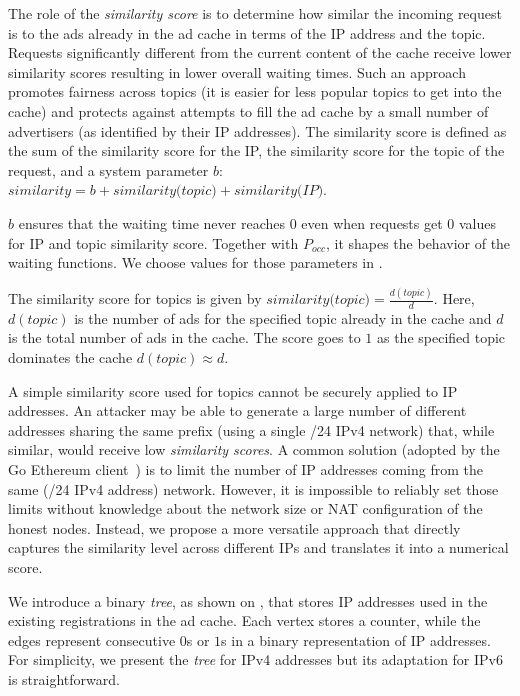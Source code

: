 The role of the \emph{similarity score} is to determine how similar the incoming request is to the ads already in the ad cache in terms of the IP address and the topic. 
Requests significantly different from the current content of the cache receive lower similarity scores resulting in lower overall waiting times. 
Such an approach promotes fairness across topics (it is easier for less popular topics to get into the cache) and protects against attempts to fill the ad cache by a small number of advertisers (as identified by their IP addresses). The similarity score is defined as the sum of the similarity score for the IP, the similarity score for the topic of the request, and a system parameter $b$: $\textit{similarity} = b + \textit{similarity(topic)} + \textit{similarity(IP)}$. 

$b$ ensures that the waiting time never reaches $0$ even when requests get $0$ values for IP and topic similarity score. Together with $P_\textit{occ}$, it shapes the behavior of the waiting functions. We choose values for those parameters in .

The similarity score for topics is given by $\textit{similarity(topic)}= \frac{d(topic)}{d}$.
Here, $d(topic)$ is the number of ads for the specified topic already in the cache and $d$ is the total number of ads in the cache. 
The score goes to $1$ as the specified topic dominates the cache $d(topic) \approx d$. 

A simple similarity score used for topics cannot be securely applied to IP addresses. 
An attacker may be able to generate a large number of different addresses sharing the same prefix (\eg using a single /24 IPv4 network) that, while similar, would receive low \emph{similarity scores}.
A common solution (\eg adopted by the Go Ethereum client~\cite{geth}) is to limit the number of IP addresses coming from the same (\eg /24 IPv4 address) network.
However, it is impossible to reliably set those limits without knowledge about the network size or NAT configuration of the honest nodes. 
Instead, we propose a more versatile approach that directly captures the similarity level across different IPs and translates it into a numerical score. 

We introduce a binary \emph{tree}, as shown on , that stores IP addresses used in the existing registrations in the ad cache.
Each vertex stores a counter, while the edges represent consecutive $0$s or $1$s in a binary representation of IP addresses.
For simplicity, we present the \emph{tree} for IPv4 addresses but its adaptation for IPv6 is straightforward.

